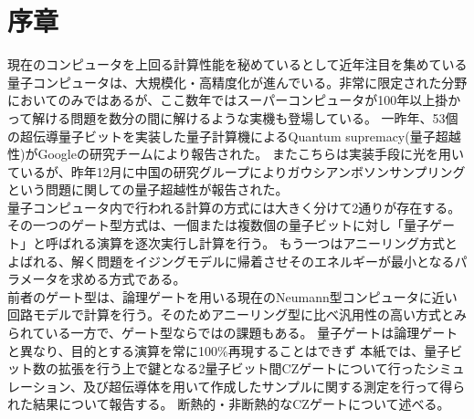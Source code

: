 \section*{序章}

現在のコンピュータを上回る計算性能を秘めているとして近年注目を集めている量子コンピュータは、大規模化・高精度化が進んでいる。非常に限定された分野においてのみではあるが、ここ数年ではスーパーコンピュータが100年以上掛かって解ける問題を数分の間に解けるような実機も登場している。
一昨年、53個の超伝導量子ビットを実装した量子計算機によるQuantum supremacy(量子超越性)がGoogleの研究チームにより報告された。
\cite{arute2019quantum} またこちらは実装手段に光を用いているが、昨年12月に中国の研究グループによりガウシアンボソンサンプリングという問題に関しての量子超越性が報告された。\cite{zhong2020quantum}\\
量子コンピュータ内で行われる計算の方式には大きく分けて2通りが存在する。
その一つのゲート型方式は、一個または複数個の量子ビットに対し「量子ゲート」と呼ばれる演算を逐次実行し計算を行う。
もう一つはアニーリング方式とよばれる、解く問題をイジングモデルに帰着させそのエネルギーが最小となるパラメータを求める方式である。\\
前者のゲート型は、論理ゲートを用いる現在のNeumann型コンピュータに近い回路モデルで計算を行う。そのためアニーリング型に比べ汎用性の高い方式とみられている一方で、ゲート型ならではの課題もある。
量子ゲートは論理ゲートと異なり、目的とする演算を常に100\%再現することはできず
本紙では、量子ビット数の拡張を行う上で鍵となる2量子ビット間CZゲートについて行ったシミュレーション、及び超伝導体を用いて作成したサンプルに関する測定を行って得られた結果について報告する。
断熱的・非断熱的なCZゲートについて述べる。